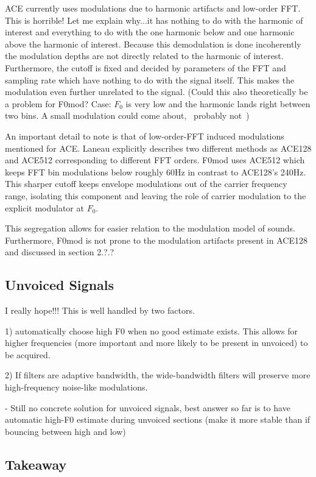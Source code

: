 \documentclass [11pt, proquest] {uwthesis}[2015/03/03]
\begin{document}
ACE currently uses modulations due to harmonic artifacts and low-order FFT.  This is horrible!  Let me explain why...it has nothing to do with the harmonic of interest and everything to do with the one harmonic below and one harmonic above the harmonic of interest.  Because this demodulation is done incoherently the modulation depths are not directly related to the harmonic of interest.  Furthermore, the cutoff is fixed and decided by parameters of the FFT and sampling rate which have nothing to do with the signal itself.  This makes the modulation even further unrelated to the signal.  (Could this also theoretically be a problem for F0mod?  Case: $F_0$ is very low and the harmonic lands right between two bins.  A small modulation could come about, ~probably not~)

An important detail to note is that of low-order-FFT induced modulations mentioned for ACE.  Laneau explicitly describes two different methods as ACE128 and ACE512 corresponding to different FFT orders.  F0mod uses ACE512 which keeps FFT bin modulations below roughly 60Hz in contrast to ACE128's 240Hz.  This sharper cutoff keeps envelope modulations out of the carrier frequency range, isolating this component and leaving the role of carrier modulation to the explicit modulator at $F_0$.

This segregation allows for easier relation to the modulation model of sounds.  Furthermore, F0mod is not prone to the modulation artifacts present in ACE128 and discussed in section 2.?.?

\subsection{Unvoiced Signals}

I really hope!!!  This is well handled by two factors.

1) automatically choose high F0 when no good estimate exists.  This allows for higher frequencies (more important and more likely to be present in unvoiced) to be acquired.

2) If filters are adaptive bandwidth, the wide-bandwidth filters will preserve more high-frequency noise-like modulations.


 - Still no concrete solution for unvoiced signals, best answer so far is to have automatic high-F0 estimate during unvoiced sections (make it more stable than if bouncing between high and low)

\subsection{Takeaway}
\end{document}

